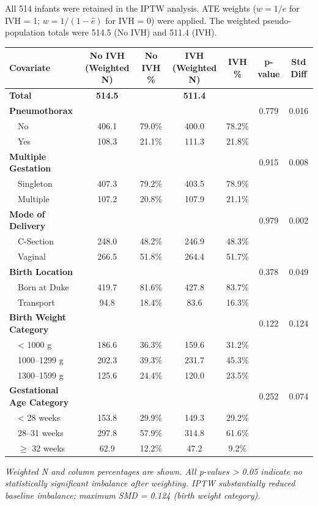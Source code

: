 \documentclass[
]{article}
\begin{document}
All 514 infants were retained in the IPTW analysis. ATE weights
(\(w = 1/\hat{e}\) for IVH = 1; \(w = 1/(1-\hat{e})\) for IVH = 0) were
applied. The weighted pseudo-population totals were 514.5 (No IVH) and
511.4 (IVH).

\begin{longtable}[]{@{}lcccccc@{}}
\toprule
Covariate & No IVH (Weighted N) & No IVH \% & IVH (Weighted N) & IVH \%
& p-value & Std Diff \\
\midrule
\endhead
\textbf{Total} & \textbf{514.5} & & \textbf{511.4} & & & \\
\textbf{Pneumothorax} & & & & & 0.779 & 0.016 \\
 No & 406.1 & 79.0\% & 400.0 & 78.2\% & & \\
 Yes & 108.3 & 21.1\% & 111.3 & 21.8\% & & \\
\textbf{Multiple Gestation} & & & & & 0.915 & 0.008 \\
 Singleton & 407.3 & 79.2\% & 403.5 & 78.9\% & & \\
 Multiple & 107.2 & 20.8\% & 107.9 & 21.1\% & & \\
\textbf{Mode of Delivery} & & & & & 0.979 & 0.002 \\
 C-Section & 248.0 & 48.2\% & 246.9 & 48.3\% & & \\
 Vaginal & 266.5 & 51.8\% & 264.4 & 51.7\% & & \\
\textbf{Birth Location} & & & & & 0.378 & 0.049 \\
 Born at Duke & 419.7 & 81.6\% & 427.8 & 83.7\% & & \\
 Transport & 94.8 & 18.4\% & 83.6 & 16.3\% & & \\
\textbf{Birth Weight Category} & & & & & 0.122 & 0.124 \\
 \textless{} 1000 g & 186.6 & 36.3\% & 159.6 & 31.2\% & & \\
 1000--1299 g & 202.3 & 39.3\% & 231.7 & 45.3\% & & \\
 1300--1599 g & 125.6 & 24.4\% & 120.0 & 23.5\% & & \\
\textbf{Gestational Age Category} & & & & & 0.252 & 0.074 \\
 \textless{} 28 weeks & 153.8 & 29.9\% & 149.3 & 29.2\% & & \\
 28--31 weeks & 297.8 & 57.9\% & 314.8 & 61.6\% & & \\
 \(\geq\) 32 weeks & 62.9 & 12.2\% & 47.2 & 9.2\% & & \\
\bottomrule
\end{longtable}

\emph{Weighted N and column percentages are shown. All p-values
\textgreater{} 0.05 indicate no statistically significant imbalance
after weighting. IPTW substantially reduced baseline imbalance; maximum
\textbar SMD\textbar{} = 0.124 (birth weight category).}
\end{document}
